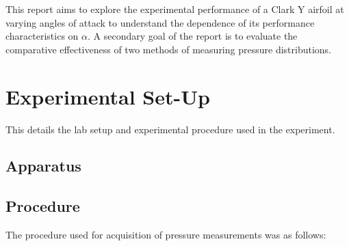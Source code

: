 \documentclass[runningheads]{llncs}
\begin{document}
This report aims to explore the experimental performance of a Clark Y airfoil at varying angles of attack to understand the dependence of its performance characteristics on $\alpha$. A secondary goal of the report is to evaluate the comparative effectiveness of two methods of measuring pressure distributions.





\section{Experimental Set-Up}

This details the lab setup and experimental procedure used in the experiment.

\subsection{Apparatus}

\subsection{Procedure}


The procedure used for acquisition of pressure measurements was as follows:
\end{document}
